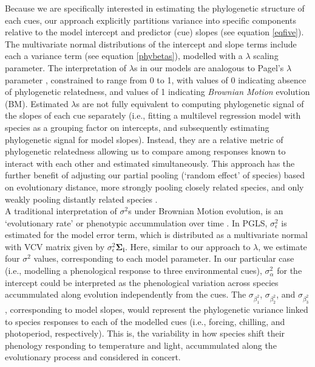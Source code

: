 \documentclass{article}\usepackage[]{graphicx}\usepackage[]{color}
\begin{document}
Because we are specifically interested in estimating the phylogenetic structure of each cues, our approach explicitly partitions variance into specific components relative to the model intercept and predictor (cue) slopes (see equation \ref{eqfive}). The multivariate normal distributions of the intercept and slope terms include each a variance term (see equation \ref{phybetas}), modelled with a $\lambda$ scaling parameter. The interpretation of $\lambda$s in our models are analogous to Pagel's \cite{pagel1999inferring} $\lambda$ parameter \citep{housworth2004phylogenetic}, constrained to range from 0 to 1, with values of 0 indicating absence of phylogenetic relatedness, and values of 1 indicating \emph{Brownian Motion} evolution (BM). Estimated $\lambda$s are not fully equivalent to computing phylogenetic signal of the slopes of each cue separately (i.e., fitting a multilevel regression model with species as a grouping factor on intercepts, and subsequently estimating phylogenetic signal for model slopes). Instead, they are a relative metric of phylogenetic relatedness allowing us to compare among responses known to interact with each other and estimated simultaneously. This approach has the further benefit of adjusting our partial pooling (`random effect' of species) based on evolutionary distance, more strongly pooling closely related species, and only weakly pooling distantly related species \citep[see Gaussian process models in][]{BDA}. \\%

A traditional interpretation of $\sigma^2$s under Brownian Motion evolution, is an `evolutionary rate’ or phenotypic accummulation over time \citep{revell2008phylogenetic}. In PGLS, $\sigma_\epsilon^2$ is estimated for the model error term, which is distributed as a multivariate normal with VCV matrix given by $\sigma_\epsilon^2$$\boldsymbol{\Sigma_i}$. Here, similar to our approach to $\lambda$, we estimate four $\sigma^2$ values, corresponding to each model parameter. In our particular case (i.e., modelling a phenological response to three environmental cues), $\sigma_\alpha^2$ for the intercept could be interpreted as the phenological variation across species accummulated along evolution independently from the cues. The $\sigma_\beta_1^2$, $\sigma_\beta_2^2$, and $\sigma_\beta_3^2$, corresponding to model slopes, would represent the phylogenetic variance linked to species responses to each of the modelled cues (i.e., forcing, chilling, and photoperiod, respectively). This is, the variability in how species shift their phenology responding to temperature and light, accummulated along the evolutionary process and considered in concert. \\ 
\end{document}
